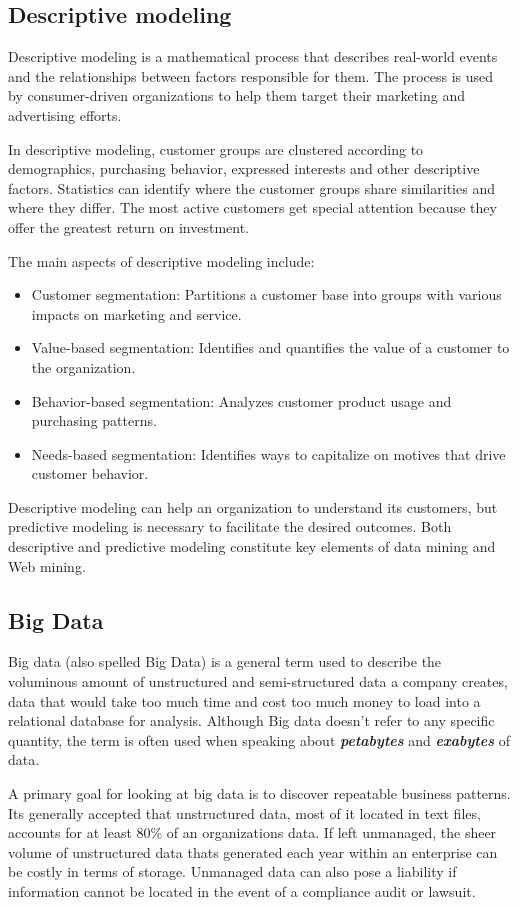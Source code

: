 \documentclass[12pt, a4paper]{report}
\theoremstyle{plain}
\theoremstyle{definition}
\theoremstyle{remark}
\begin{document}
\subsection{Descriptive modeling}
Descriptive modeling is a mathematical process that describes real-world events and the relationships between factors responsible for them. The process is used by consumer-driven organizations to help them target their marketing and advertising efforts.

In descriptive modeling, customer groups are clustered according to demographics, purchasing behavior, expressed interests and other descriptive factors. Statistics can identify where the customer groups share similarities and where they differ. The most active customers get special attention because they offer the greatest return on investment.

The main aspects of descriptive modeling include:

\begin{itemize}
\item Customer segmentation: Partitions a customer base into groups with various impacts on marketing and service.
\item Value-based segmentation: Identifies and quantifies the value of a customer to the organization.
\item Behavior-based segmentation: Analyzes customer product usage and purchasing patterns.
\item Needs-based segmentation: Identifies ways to capitalize on motives that drive customer behavior.
\end{itemize}
Descriptive modeling can help an organization to understand its customers, but predictive modeling is necessary to facilitate the desired outcomes. Both descriptive and predictive modeling constitute key elements of data mining and Web mining.

\subsection{Big Data}
Big data (also spelled Big Data) is a general term used to describe the voluminous amount of unstructured and semi-structured data a company creates, data that would take too much time and cost too much money to load into a relational database for analysis. Although Big data doesn't refer to any specific quantity, the term is often used when speaking about \textbf{\emph{petabytes}} and \textbf{\emph{exabytes}} of data.


A primary goal for looking at big data is to discover repeatable business patterns. Its generally accepted that unstructured data, most of it located in text files, accounts for at least $80\%$ of an organizations data. If left unmanaged, the sheer volume of unstructured data thats generated each year within an enterprise can be costly in terms of storage. Unmanaged data can also pose a liability if information cannot be located in the event of a compliance audit or lawsuit.
\end{document}
